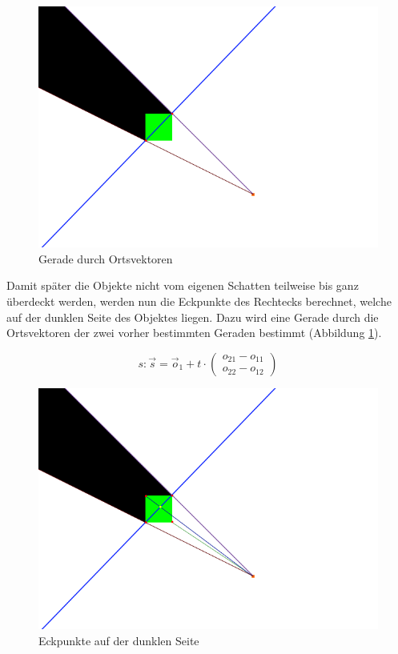 \begin{figure}[t]
	\centering
	\includegraphics[width=\columnwidth]{images/durchfuehrung_2.png}
	\caption{Gerade durch Ortsvektoren}
	\label{fig:durch4}
\end{figure}

Damit später die Objekte nicht vom eigenen Schatten teilweise bis ganz überdeckt werden, werden nun
die Eckpunkte des Rechtecks berechnet, welche auf der dunklen Seite des Objektes liegen. Dazu wird
eine Gerade durch die Ortsvektoren der zwei vorher bestimmten Geraden bestimmt (Abbildung
\ref{fig:durch4}).

\begin{equation}
	s: \vec{s} = \vec{o}_1 + t \cdot \left(\begin{array}{c} o_{21} - o_{11} \\ o_{22} - o_{12} \end{array}\right)
\end{equation}

\begin{figure}[t]
	\centering
	\includegraphics[width=\columnwidth]{images/durchfuehrung_3.png}
	\caption{Eckpunkte auf der dunklen Seite}
	\label{fig:durch5}
\end{figure}

